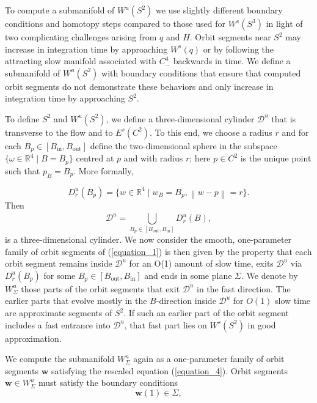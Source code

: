 \documentclass{ws-ijbc}
\begin{document}
To compute a submanifold of $W^{u}(S^2)$ we use slightly different boundary conditions and homotopy steps compared to those used for $W^s(S^3)$ in light of two complicating challenges arising from $q$ and $H$.  Orbit segments near $S^2$ may increase in integration time by approaching $W^s(q)$ or by following the attracting slow manifold associated with $C^4_-$ backwards in time.  We define a submanifold of $W^u(S^2)$ with boundary conditions that ensure that computed orbit segments do not demonstrate these behaviors and only increase in integration time by approaching $S^2$.  

To define $S^2$ and $W^u(S^2)$, we define a three-dimensional cylinder $\mathscr{D}^u$ that is transverse to the flow and to $E^s(C^2)$.  To this end, we choose a radius $r$ and for each $B_p \in [B_{\mathrm{in}}, B_{\mathrm{out}}]$ define the two-dimensional sphere in the subspace $\{\omega \in \mathbb{R}^4 \; | \; B=B_p\}$ centred at $p$ and with radius $r$; here $p \in C^2$ is the unique point such that $p_B = B_p$.  More formally,

\begin{equation*}
D^u_r(B_p)=\{w \in \mathbb{R}^4 \;|\; w_B = B_p, \left\lVert w-p \right\lVert  = r\}.
\end{equation*}
Then 
\begin{equation*}
\mathscr{D}^u = \bigcup\limits_{B_p \in [B_{\mathrm{out}}, B_{\mathrm{in}}]}^{}D^u_r(B),
\end{equation*}
is a three-dimensional cylinder.  We now consider the smooth, one-parameter family of orbit segments of (\ref{equation_1}) is then given by the property that each orbit segment remains inside $\mathscr{D}^u$ for an O(1) amount of slow time, exits $\mathscr{D}^u$ via $D^u_r(B_p)$ for some $B_p \in [B_{\text{out}}, B_{\text{in}}]$ and ends in some plane $\Sigma$.  We denote by $W^u_\Sigma$ those parts of the orbit segments that exit $\mathscr{D}^u$ in the fast direction.  The earlier parts that evolve mostly in the $B$-direction inside $\mathscr{D}^u$ for $O(1)$ slow time are approximate segments of $S^2$.  If such an earlier part of the orbit segment includes a fast entrance into $\mathscr{D}^u$, that fast part lies on $W^s(S^2)$ in good approximation.

We compute the submanifold $W^u_\Sigma$ again as a one-parameter family of orbit segments $\mathbf{w}$ satisfying the rescaled equation (\ref{equation_4}).  Orbit segments $\mathbf{w} \in W^u_\Sigma$ must satisfy the boundary conditions
\begin{equation}
	\mathbf{w}(1) \in \Sigma,
	\label{general_conditions_unstable_1}
\end{equation}
\end{document}
